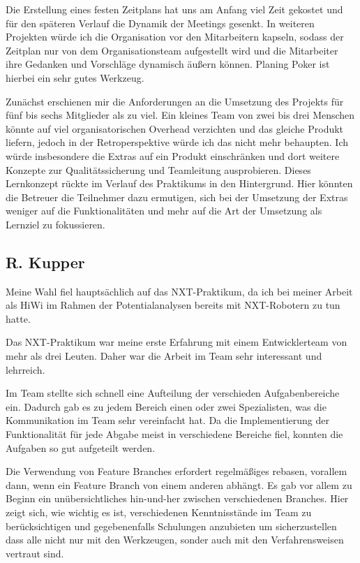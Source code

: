 \documentclass[oneside,abstractoff,a4paper]{scrartcl}
\begin{document}
Die Erstellung eines festen Zeitplans hat uns am Anfang viel Zeit gekostet und für den späteren Verlauf die Dynamik der Meetings gesenkt. In weiteren Projekten würde ich die Organisation vor den Mitarbeitern kapseln, sodass der Zeitplan nur von dem Organisationsteam aufgestellt wird und die Mitarbeiter ihre Gedanken und Vorschläge dynamisch äußern können. Planing Poker ist hierbei ein sehr gutes Werkzeug.

Zunächst erschienen mir die Anforderungen an die Umsetzung des Projekts für fünf bis sechs Mitglieder als zu viel. Ein kleines Team von zwei bis drei Menschen könnte auf viel organisatorischen Overhead verzichten und das gleiche Produkt liefern, jedoch in der Retroperspektive würde ich das nicht mehr behaupten. Ich würde insbesondere die Extras auf ein Produkt einschränken und dort weitere Konzepte zur Qualitätssicherung und Teamleitung ausprobieren. Dieses Lernkonzept rückte im Verlauf des Praktikums in den Hintergrund. Hier könnten die Betreuer die Teilnehmer dazu ermutigen, sich bei der Umsetzung der Extras weniger auf die Funktionalitäten und mehr auf die Art der Umsetzung als Lernziel zu fokussieren.


\subsection{R. Kupper}
Meine Wahl fiel hauptsächlich auf das NXT-Praktikum, da ich bei meiner Arbeit als HiWi im Rahmen der Potentialanalysen bereits mit NXT-Robotern zu tun hatte.

Das NXT-Praktikum war meine erste Erfahrung mit einem Entwicklerteam von mehr als drei Leuten. Daher war die Arbeit im Team sehr interessant und lehrreich.

Im Team stellte sich schnell eine Aufteilung der verschieden Aufgabenbereiche ein. Dadurch gab es zu jedem Bereich einen oder zwei Spezialisten, was die Kommunikation im Team sehr vereinfacht hat. Da die Implementierung der Funktionalität für jede Abgabe meist in verschiedene Bereiche fiel, konnten die Aufgaben so gut aufgeteilt werden. 

Die Verwendung von Feature Branches erfordert regelmäßiges rebasen, vorallem dann, wenn ein Feature Branch von einem anderen abhängt. Es gab vor allem zu Beginn ein unübersichtliches hin-und-her zwischen verschiedenen Branches. Hier zeigt sich, wie wichtig es ist, verschiedenen Kenntnisstände im Team zu berücksichtigen und gegebenenfalls Schulungen anzubieten um sicherzustellen dass alle nicht nur mit den Werkzeugen, sonder auch mit den Verfahrensweisen vertraut sind.
\end{document}
